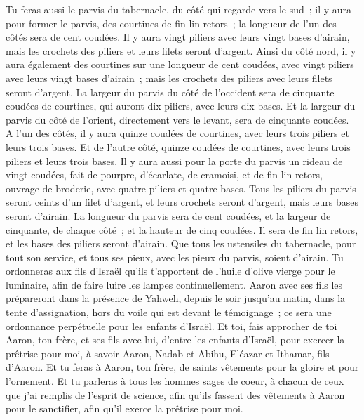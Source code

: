 \begin{multicols}{2}
Tu feras aussi le parvis du tabernacle, du côté qui regarde vers le sud~; il y aura pour former le parvis, des courtines de fin lin retors~; la longueur de l'un des côtés sera de cent coudées.
Il y aura vingt piliers avec leurs vingt bases d'airain, mais les crochets des piliers et leurs filets seront d'argent.
Ainsi du côté nord, il y aura également des courtines sur une longueur de cent coudées, avec vingt piliers avec leurs vingt bases d'airain~; mais les crochets des piliers avec leurs filets seront d'argent.
La largeur du parvis du côté de l'occident sera de cinquante coudées de courtines, qui auront dix piliers, avec leurs dix bases.
Et la largeur du parvis du côté de l'orient, directement vers le levant, sera de cinquante coudées.
A l'un des côtés, il y aura quinze coudées de courtines, avec leurs trois piliers et leurs trois bases.
Et de l'autre côté, quinze coudées de courtines, avec leurs trois piliers et leurs trois bases.
Il y aura aussi pour la porte du parvis un rideau de vingt coudées, fait de pourpre, d'écarlate, de cramoisi, et de fin lin retors, ouvrage de broderie, avec quatre piliers et quatre bases.
Tous les piliers du parvis seront ceints d'un filet d'argent, et leurs crochets seront d'argent, mais leurs bases seront d'airain.
La longueur du parvis sera de cent coudées, et la largeur de cinquante, de chaque côté~; et la hauteur de cinq coudées. Il sera de fin lin retors, et les bases des piliers seront d'airain.
Que tous les ustensiles du tabernacle, pour tout son service, et tous ses pieux, avec les pieux du parvis, soient d'airain.
Tu ordonneras aux fils d'Israël qu'ils t'apportent de l'huile d'olive vierge pour le luminaire, afin de faire luire les lampes continuellement.
Aaron avec ses fils les prépareront dans la présence de Yahweh, depuis le soir jusqu'au matin, dans la tente d'assignation, hors du voile qui est devant le témoignage~; ce sera une ordonnance perpétuelle pour les enfants d'Israël.
\VerseOne{}Et toi, fais approcher de toi Aaron, ton frère, et ses fils avec lui, d'entre les enfants d'Israël, pour exercer la prêtrise pour moi, à savoir Aaron, Nadab et Abihu, Eléazar et Ithamar, fils d'Aaron.
Et tu feras à Aaron, ton frère, de saints vêtements pour la gloire et pour l'ornement.
Et tu parleras à tous les hommes sages de coeur, à chacun de ceux que j'ai remplis de l'esprit de science, afin qu'ils fassent des vêtements à Aaron pour le sanctifier, afin qu'il exerce la prêtrise pour moi.

\end{multicols}
